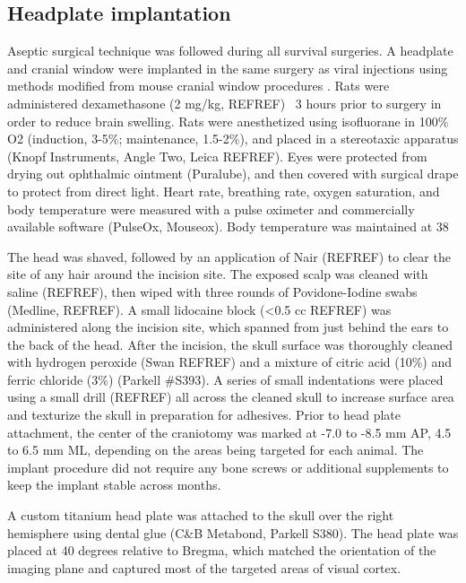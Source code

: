 \subsection{Headplate implantation}
Aseptic surgical technique was followed during all survival surgeries. A headplate and cranial window were implanted in the same surgery as viral injections using methods modified from mouse cranial window procedures \cite{Goldey2014}. Rats were administered dexamethasone (2 mg/kg, REFREF) ~3 hours prior to surgery in order to reduce brain swelling. Rats were anesthetized using isofluorane in 100\% O2 (induction, 3-5\%; maintenance, 1.5-2\%), and placed in a stereotaxic apparatus (Knopf Instruments, Angle Two, Leica REFREF). Eyes were protected from drying out ophthalmic ointment (Puralube), and then covered with surgical drape to protect from direct light. Heart rate, breathing rate, oxygen saturation, and body temperature were measured with a pulse oximeter and commercially available software (PulseOx, Mouseox). Body temperature was maintained at 38%

The head was shaved, followed by an application of Nair (REFREF) to clear the site of any hair around the incision site. The exposed scalp was cleaned with saline (REFREF), then wiped with three rounds of Povidone-Iodine swabs (Medline, REFREF). A small lidocaine block (<0.5 cc REFREF) was administered along the incision site, which spanned from just behind the ears to the back of the head. After the incision, the skull surface was thoroughly cleaned with hydrogen peroxide (Swan REFREF) and a mixture of citric acid (10\%) and ferric chloride (3\%) (Parkell #S393). A series of small indentations were placed using a small drill (REFREF) all across the cleaned skull to increase surface area and texturize the skull in preparation for adhesives. Prior to head plate attachment, the center of the craniotomy was marked at -7.0 to -8.5 mm AP, 4.5 to 6.5 mm ML, depending on the areas being targeted for each animal. The implant procedure did not require any bone screws or additional supplements to keep the implant stable across months. 

A custom titanium head plate was attached to the skull over the right hemisphere using dental glue (C&B Metabond, Parkell S380). The head plate was placed at 40 degrees relative to Bregma, which matched the orientation of the imaging plane and captured most of the targeted areas of visual cortex. 

